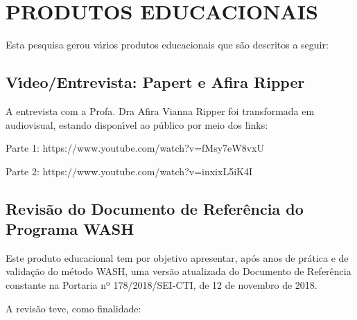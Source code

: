 \documentclass[
12pt,		%
openright,	%
twoside,  %
a4paper,			%
chapter=TITLE,		%
english,			%
french,				%
spanish,			%
brazil				%
]{USPSC-classe/USPSC}
\begin{document}
\chapter[PRODUTOS EDUCACIONAIS]{PRODUTOS EDUCACIONAIS}\label{PRODUTOS EDUCACIONAIS}
Esta pesquisa gerou v\'arios produtos educacionais que s\~ao descritos a seguir:









\section[V\'{\i}deo/Entrevista: Papert e Afira Ripper]{V\'{\i}deo/Entrevista: Papert e Afira Ripper}\label{V\'{\i}deo/Entrevista: Papert e Afira Ripper}
A entrevista com a Profa. Dra Afira Vianna Ripper foi transformada em audiovisual, estando dispon\'{\i}vel ao p\'ublico por meio dos links:










\begin{alineas}
\item Parte 1: https://www.youtube.com/watch?v=fMsy7eW8vxU
\item Parte 2: https://www.youtube.com/watch?v=inxixL5iK4I
\end{alineas}

\section[Revis\~ao do Documento de Refer\^encia do Programa WASH]{Revis\~ao do Documento de Refer\^encia do Programa WASH}\label{Revis\~ao do Documento de Refer\^encia do Programa WASH}
Este produto educacional tem por objetivo apresentar, ap\'os anos de pr\'atica e de valida\c{c}\~ao do m\'etodo WASH, uma vers\~ao atualizada do Documento de Refer\^encia constante na Portaria nº 178/2018/SEI-CTI, de 12 de novembro de 2018.









A revis\~ao teve, como finalidade:
\end{document}
